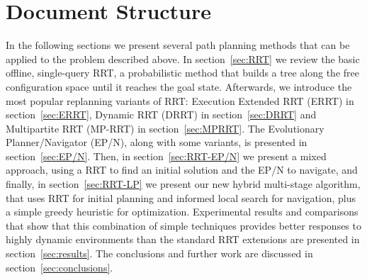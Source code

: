 \section{Document Structure}

In the following sections we present several path planning methods that can be
applied to the problem described above. In section~\ref{sec:RRT} we review
the basic offline, single-query RRT, a probabilistic method that builds a
tree along the free configuration space until it reaches the goal state.
Afterwards, we introduce the most popular replanning variants of
RRT: Execution Extended RRT (ERRT) in section~\ref{sec:ERRT}, Dynamic RRT (DRRT) in
section~\ref{sec:DRRT} and Multipartite RRT (MP-RRT) in section~\ref{sec:MPRRT}.
The Evolutionary Planner/Navigator (EP/N), along with some variants, is presented
in section~\ref{sec:EP/N}.
Then, in section~\ref{sec:RRT-EP/N} we present a mixed approach, using a RRT to
find an initial solution and the EP/N to navigate, and finally, in section~\ref{sec:RRT-LP} we
present our new hybrid multi-stage algorithm, that uses RRT for initial
planning and informed local search for navigation, plus a simple greedy
heuristic for optimization. Experimental results and
comparisons that show that this combination of simple techniques provides better
responses to highly dynamic environments than the standard RRT extensions are
presented in section~\ref{sec:results}. The
conclusions and further work are discussed in section~\ref{sec:conclusions}.
